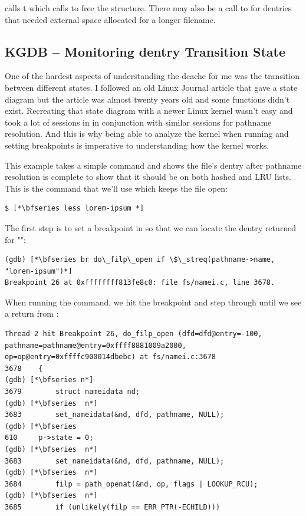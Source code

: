   calls t which calls  to free the  structure. There may also be a call to  for dentries that needed external space allocated for a longer filename. 


\subsection{KGDB -- Monitoring dentry Transition State}

One of the hardest aspects of understanding the dcache for me was the transition between different states. I followed an old Linux Journal article that gave a state diagram but the article was almost twenty years old and some functions didn't exist. Recreating that state diagram with a newer Linux kernel wasn't easy and took a lot of sessions in  in conjunction with similar sessions for pathname resolution. And this is why being able to analyze the kernel when running and setting breakpoints is imperative to understanding how the kernel works.

This example takes a simple command and shows the file's dentry after pathname resolution is complete to show that it should be on both hashed and LRU lists. This is the command that we'll use which keeps the file open:

\begin{lstlisting}
$ [*\bfseries less lorem-ipsum *]
\end{lstlisting}

\noindent
The first step is to set a breakpoint in  so that we can locate the dentry returned for "":

\begin{lstlisting}
(gdb) [*\bfseries br do\_filp\_open if \$\_streq(pathname->name, "lorem-ipsum")*]
Breakpoint 26 at 0xffffffff813fe8c0: file fs/namei.c, line 3678.
\end{lstlisting}

\noindent
When running the command, we hit the breakpoint and step through  until we see a return from :

\begin{lstlisting}
Thread 2 hit Breakpoint 26, do_filp_open (dfd=dfd@entry=-100, 
pathname=pathname@entry=0xffff8881009a2000, 
op=op@entry=0xffffc900014dbebc) at fs/namei.c:3678
3678	{
(gdb) [*\bfseries n*]
3679		struct nameidata nd;
(gdb) [*\bfseries  n*]
3683		set_nameidata(&nd, dfd, pathname, NULL);
(gdb) [*\bfseries 
610		p->state = 0;
(gdb) [*\bfseries  n*]
3683		set_nameidata(&nd, dfd, pathname, NULL);
(gdb) [*\bfseries  n*]
3684		filp = path_openat(&nd, op, flags | LOOKUP_RCU);
(gdb) [*\bfseries  n*]
3685		if (unlikely(filp == ERR_PTR(-ECHILD)))
\end{lstlisting}

